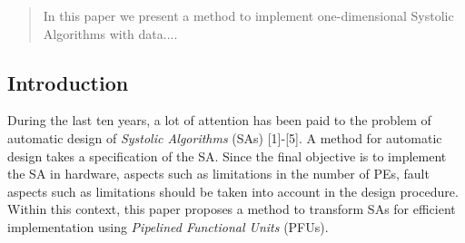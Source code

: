 \begin{abstract}
In this paper we present a method to implement one-dimensional Systolic 
Algorithms with data....
\end{abstract}

\begin{article}
\section{Introduction}
During the last ten years,
a lot of attention has been paid to the problem of automatic design of 
{\it Systolic Algorithms} (SAs) [1]-[5]. A method for
automatic design takes a specification of the SA.
Since the final objective is to implement
the SA in hardware, aspects such
as limitations in the number of PEs, fault aspects such as
limitations should be taken into account in the design procedure.
Within this context, this paper proposes a method to transform SAs for 
efficient implementation using {\it Pipelined Functional Units}
(PFUs).


\end{article}



